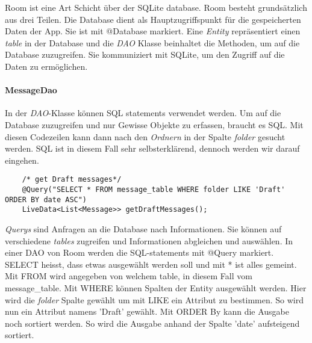 \documentclass[a4paper,11pt]{article}
\begin{document}


\newpage
\begingroup
\setlength{\intextsep}{10pt}
\setlength{\columnsep}{15pt}




Room ist eine Art Schicht über der SQLite database. 
Room besteht grundsätzlich aus drei Teilen. Die Database dient als Hauptzugriffspunkt für die gespeicherten Daten der App. Sie ist mit @Database markiert. 
Eine \textit{Entity} repräsentiert einen \textit{table} in der Database und die \textit{DAO} Klasse beinhaltet die Methoden, um auf die Database zuzugreifen. Sie kommuniziert
mit SQLite, um den Zugriff auf die Daten zu ermöglichen. \cite{roomStructure}


\paragraph{MessageDao}

In der \textit{DAO}-Klasse können SQL statements verwendet werden. Um auf die Database zuzugreifen und nur Gewisse 
Objekte zu erfassen, braucht es SQL. Mit diesen Codezeilen kann dann nach den \textit{Ordnern} in der Spalte \textit{folder} gesucht werden.
SQL ist in diesem Fall sehr selbsterklärend, 
dennoch werden wir darauf eingehen.\\

\lstset{language=SQL}
\begin{lstlisting}
    /* get Draft messages*/
    @Query("SELECT * FROM message_table WHERE folder LIKE 'Draft' ORDER BY date ASC")
    LiveData<List<Message>> getDraftMessages();
\end{lstlisting}

\textit{Querys} sind Anfragen an die Database nach Informationen. Sie können auf verschiedene \textit{tables} zugreifen und Informationen abgleichen und auswählen. 
In einer DAO von Room werden die SQL-statements mit @Query markiert. SELECT heisst, dass etwas ausgewählt werden soll und mit * ist alles gemeint. Mit FROM wird angegeben von 
welchem table, in diesem Fall vom message\_table. Mit WHERE können Spalten der Entity ausgewählt werden. Hier wird die \textit{folder} Spalte 
gewählt um mit LIKE ein Attribut zu bestimmen. So wird nun ein Attribut namens 'Draft' gewählt. Mit ORDER By kann die Ausgabe noch sortiert werden. So wird die Ausgabe anhand der Spalte 'date'
aufsteigend sortiert. \cite{queryExpl}
\end{document}
